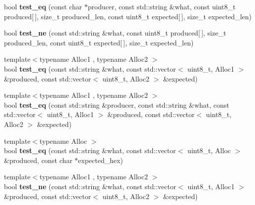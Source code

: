 \begin{DoxyCompactItemize}
bool {\bfseries test\+\_\+eq} (const char $\ast$producer, const std\+::string \&what, const uint8\+\_\+t produced\mbox{[}$\,$\mbox{]}, size\+\_\+t produced\+\_\+len, const uint8\+\_\+t expected\mbox{[}$\,$\mbox{]}, size\+\_\+t expected\+\_\+len)
\item 
\mbox{\label{class_botan___tests_1_1_test_1_1_result_a669f049a64cd6964d7aa42da48e6f9eb}} 
bool {\bfseries test\+\_\+ne} (const std\+::string \&what, const uint8\+\_\+t produced\mbox{[}$\,$\mbox{]}, size\+\_\+t produced\+\_\+len, const uint8\+\_\+t expected\mbox{[}$\,$\mbox{]}, size\+\_\+t expected\+\_\+len)
\item 
\mbox{\label{class_botan___tests_1_1_test_1_1_result_a2937503b18710d34cb25c7eeee377f16}} 
{\footnotesize template$<$typename Alloc1 , typename Alloc2 $>$ }\\bool {\bfseries test\+\_\+eq} (const std\+::string \&what, const std\+::vector$<$ uint8\+\_\+t, Alloc1 $>$ \&produced, const std\+::vector$<$ uint8\+\_\+t, Alloc2 $>$ \&expected)
\item 
\mbox{\label{class_botan___tests_1_1_test_1_1_result_a2de4a9cd41763d5236e70fd26b0fe99c}} 
{\footnotesize template$<$typename Alloc1 , typename Alloc2 $>$ }\\bool {\bfseries test\+\_\+eq} (const std\+::string \&producer, const std\+::string \&what, const std\+::vector$<$ uint8\+\_\+t, Alloc1 $>$ \&produced, const std\+::vector$<$ uint8\+\_\+t, Alloc2 $>$ \&expected)
\item 
\mbox{\label{class_botan___tests_1_1_test_1_1_result_ade7ee911871f36a3f49b82033513f54c}} 
{\footnotesize template$<$typename Alloc $>$ }\\bool {\bfseries test\+\_\+eq} (const std\+::string \&what, const std\+::vector$<$ uint8\+\_\+t, Alloc $>$ \&produced, const char $\ast$expected\+\_\+hex)
\item 
\mbox{\label{class_botan___tests_1_1_test_1_1_result_a9d2954d9cb4761a07bb276e649c85175}} 
{\footnotesize template$<$typename Alloc1 , typename Alloc2 $>$ }\\bool {\bfseries test\+\_\+ne} (const std\+::string \&what, const std\+::vector$<$ uint8\+\_\+t, Alloc1 $>$ \&produced, const std\+::vector$<$ uint8\+\_\+t, Alloc2 $>$ \&expected)

\end{DoxyCompactItemize}
